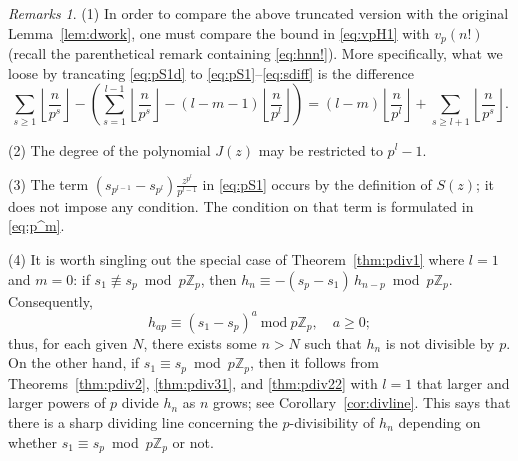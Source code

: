 \documentclass[12pt,reqno]{amsart}
\numberwithin{equation}{section}
\theoremstyle{remark}
\newtheorem*{remarks}{Remarks}
\begin{document}
\begin{remarks} \label{rem:1}
(1) In order to compare the above truncated version with the original
Lemma~\ref{lem:dwork}, one must compare
the bound in \eqref{eq:vpH1} with $v_p(n!)$ (recall the
parenthetical remark containing \eqref{eq:hnn!}).
More specifically, what we loose by trancating \eqref{eq:pS1d} to
\eqref{eq:pS1}--\eqref{eq:sdiff} is the difference
$$
\sum_{s\geq1} {\left\lfloor{\frac{n}{p^s}}\right\rfloor}
-
\left(\sum_{s=1}^{l-1} {\left\lfloor{\frac{n}{p^s}}\right\rfloor}
-(l-m-1){\left\lfloor{\frac {n} {p^l}}\right\rfloor}\right)
=(l-m){\left\lfloor{\frac {n} {p^l}}\right\rfloor}+\sum_{s\ge l+1} {\left\lfloor{\frac{n}{p^s}}\right\rfloor}.
$$

\medskip
(2) The degree of the polynomial $J(z)$ may be restricted to 
$p^l-1$.

\medskip
(3) The term $(s_{p^{l-1}}-s_{p^l})\frac {z^{p^l}} {p^{l-1}}$ in
\eqref{eq:pS1} occurs by the definition of $S(z)$; it does not
impose any condition. The condition on that term is formulated
in \eqref{eq:p^m}.

\medskip
(4) It is worth singling out the special case of Theorem~\ref{thm:pdiv1}
where $l=1$ and $m=0$: if 
\hbox{$s_{1}\not\equiv s_{p}$~mod~$p{\mathbb{Z}}_p$}, then 
$h_n\equiv -(s_{p}-s_{1})\,h_{n-p} $~mod~$p{\mathbb{Z}}_p$. Consequently,
$$h_{ap}\equiv(s_{1}-s_{p})^a~\text{mod}~p{\mathbb{Z}}_p,\quad a\geq0;$$ 
thus, for each given $N$, there exists some 
$n>N$ such that $h_n$ is not divisible by $p$.
On the other hand, if
$s_{1}\equiv s_{p}$~mod~$p{\mathbb{Z}}_p$, then it follows from 
Theorems~\ref{thm:pdiv2}, \ref{thm:pdiv31}, and \ref{thm:pdiv22} 
with $l=1$
that larger and larger
powers of $p$ divide $h_n$ as $n$ grows; see Corollary~\ref{cor:divline}.
This says that there is a sharp dividing line concerning the
$p$-divisibility of $h_n$ depending on whether
$s_{1}\equiv s_{p}$~mod~$p{\mathbb{Z}}_p$ or not.
\end{remarks}
\end{document}
